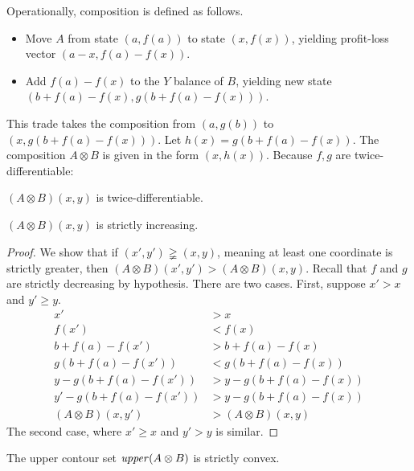 Operationally, composition is defined as follows.
\begin{itemize}
\item Move $A$ from state $(a,f(a))$ to state $(x,f(x))$,
yielding profit-loss vector $(a-x,f(a)-f(x))$.
\item Add $f(a)-f(x)$ to the $Y$ balance of $B$,
  yielding new state $(b+f(a)-f(x), g(b+f(a)-f(x)))$.
\end{itemize}
This trade
takes the composition from $(a,g(b))$ to $(x, g(b+f(a)-f(x)))$.
Let $h(x) = g(b+f(a)-f(x))$.
The composition $A \otimes B$ is given in the form $(x,h(x))$. Because $f,g$ are twice-differentiable:
\begin{lemma}
  $(A \otimes B)(x,y)$ is twice-differentiable.
\end{lemma}
\begin{lemma}
  $(A \otimes B)(x,y)$ is strictly increasing.
\end{lemma}
\begin{proof}
  We show that if $(x',y') \gneqq (x,y)$, meaning at least one coordinate is strictly greater,
  then $(A \otimes B)(x',y') > (A \otimes B)(x,y)$.
  Recall that $f$ and $g$ are strictly decreasing by hypothesis.
  There are two cases.
  First, suppose $x' > x$ and $y' \geq y$.
\begin{align*}
  x' &> x\\
  f(x') &< f(x)\\
  b+f(a)-f(x') &> b+f(a)-f(x)\\
  g(b+f(a)-f(x')) &< g(b+f(a)-f(x))\\
  y-g(b+f(a)-f(x')) &> y-g(b+f(a)-f(x))\\
  y'-g(b+f(a)-f(x')) &> y-g(b+f(a)-f(x))\\
  (A \otimes B)(x,y') &> (A \otimes B)(x,y)
\end{align*}
  The second case, where $x' \geq x$ and $y' > y$ is similar.
\end{proof}
\begin{lemma}
  The upper contour set $\mathit{upper}(A \otimes B)$ is strictly convex.
\end{lemma}

